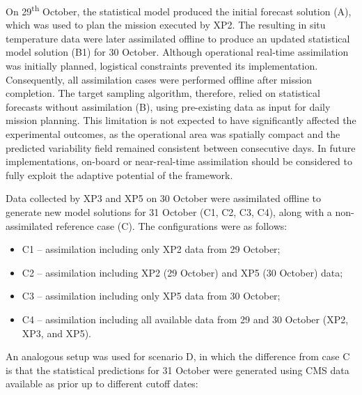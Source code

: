 
On 29\textsuperscript{th} October, the statistical model produced the
initial forecast solution (A), which was used to plan the mission
executed by XP2. The resulting in situ temperature data were later
assimilated offline to produce an updated statistical model solution
(B1) for 30 October. Although operational real-time assimilation was
initially planned, logistical constraints prevented its
implementation. Consequently, all assimilation cases were performed
offline after mission completion. The target sampling algorithm,
therefore, relied on statistical forecasts without assimilation (B),
using pre-existing data as input for daily mission planning. This
limitation is not expected to have significantly affected the
experimental outcomes, as the operational area was spatially compact
and the predicted variability field remained consistent between
consecutive days. In future implementations, on-board or
near-real-time assimilation should be considered to fully exploit the
adaptive potential of the framework.

Data collected by XP3 and XP5 on 30 October were assimilated offline
to generate new model solutions for 31 October (C1, C2, C3, C4), along
with a non-assimilated reference case (C). The configurations were as
follows:

\begin{itemize}
    \item C1 – assimilation including only XP2 data from 29 October;
    \item C2 – assimilation including XP2 (29 October) and XP5 (30 October) data;
    \item C3 – assimilation including only XP5 data from 30 October;
    \item C4 – assimilation including all available data from 29 and 30 October (XP2, XP3, and XP5).
\end{itemize}

An analogous setup was used for scenario D, in which the difference
from case C is that the statistical predictions for 31 October were
generated using CMS data available as prior up to different cutoff dates:

